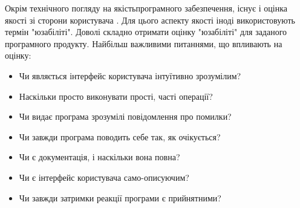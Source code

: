 Окрім технічного погляду на якістьпрограмного забезпечення,
існує і оцінка якості зі сторони користувача \cite{os-development,testing-black}.
Для цього аспекту якості іноді використовують термін "юзабіліті".
Доволі складно отримати оцінку "юзабіліті" для
заданого програмного продукту. Найбільш важливими питаннями,
що впливають на оцінку:

\begin{itemize}
    \item Чи являється інтерфейс користувача інтуїтивно зрозумілим?
    \item Наскільки просто виконувати прості, часті операції?
    \item Чи видає програма зрозумілі повідомлення про помилки?
    \item Чи завжди програма поводить себе так, як очікується?
    \item Чи є документація, і наскільки вона повна?
    \item Чи є інтерфейс користувача само-описуючим?
    \item Чи завжди затримки реакції програми є прийнятними?
\end{itemize}

